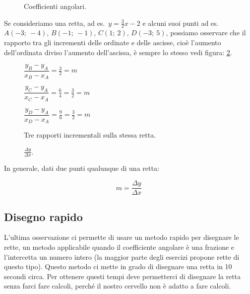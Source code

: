\begin{inaccessibleblock}
 \begin{figure}[h]
 \centering
 \caption{Coefficienti angolari.}\label{fig:coeffang}
\end{figure}
\end{inaccessibleblock}

Se consideriamo una retta, ad es.~$y=\frac{3}{2}x -2$ e alcuni suoi punti
ad es.~$A(-3;~-4)$, $B(-1;~-1)$, $C(1;~2)$, $D(-3;~5)$, possiamo osservare che 
il rapporto tra gli incrementi delle ordinate e delle ascisse, 
cioè l'aumento dell'ordinata diviso l'aumento dell'ascissa, è sempre lo 
stesso vedi figura: \ref{fig:rappincr}.

\begin{inaccessibleblock}
 \begin{figure}[h]
 \centering
 \begin{minipage}[]{.50\textwidth}
$\dfrac{y_B - y_A}{x_B - x_A} = \frac{3}{2} = m$

$\dfrac{y_C - y_A}{x_C - x_A} = \frac{6}{4} = \frac{3}{2} = m$

$\dfrac{y_D - y_A}{x_D - x_A} = \frac{9}{6} = \frac{3}{2} = m$
  \caption{Tre rapporti incrementali sulla stessa retta.}\label{calc:rappincr}
 \end{minipage}
 \begin{minipage}[]{.40\textwidth}
   \centering
  \caption{$\frac{\Delta y}{\Delta x}$.}\label{fig:rappincr}
 \end{minipage}
\end{figure}
\end{inaccessibleblock}

In generale, dati due punti qualunque di una retta:

\[m = \frac{\Delta y}{\Delta x}\]

\subsection{Disegno rapido}

L'ultima osservazione ci permette di usare un metodo rapido per disegnare 
le rette, un metodo applicabile quando il coefficiente angolare è una 
frazione e l'intercetta un numero intero (la maggior parte degli esercizi 
propone rette di questo tipo). Questo metodo ci mette in grado di disegnare 
una retta in 10 secondi circa. Per ottenere questi tempi deve permetterci di 
disegnare la retta senza farci fare calcoli, perché il nostro cervello non è 
adatto a fare calcoli.

